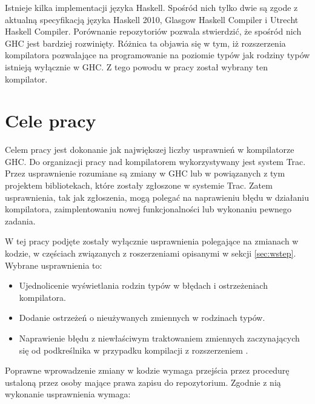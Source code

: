 Istnieje kilka implementacji języka Haskell. Spośród nich tylko dwie są zgode z aktualną specyfikacją języka Haskell 2010, Glasgow Haskell Compiler i Utrecht Haskell Compiler\cite{WikiImplementations}. Porównanie repozytoriów pozwala stwierdzić, że spośród nich GHC jest bardziej rozwinięty. Różnica ta objawia się w tym, iż rozszerzenia kompilatora pozwalające na programowanie na poziomie typów jak rodziny typów istnieją wyłącznie w GHC\cite{UHCUserGuide}. Z tego powodu w pracy został wybrany ten kompilator.


\section{Cele pracy}\label{sec:cele_pracy}

Celem pracy jest dokonanie jak największej liczby usprawnień w kompilatorze GHC. Do organizacji pracy nad kompilatorem wykorzystywany jest system Trac. Przez usprawnienie rozumiane są zmiany w GHC lub w powiązanych z tym projektem bibliotekach, które zostały zgłoszone w systemie Trac. Zatem usprawnienia, tak jak zgłoszenia, mogą polegać na naprawieniu błędu w działaniu kompilatora, zaimplentowaniu nowej funkcjonalności lub wykonaniu pewnego zadania.

W tej pracy podjęte zostały wyłącznie usprawnienia polegające na zmianach w kodzie, w częściach związanych z roszerzeniami opisanymi w sekcji \ref{sec:wstep}. Wybrane usprawnienia to:

\begin{itemize}
 \item Ujednolicenie wyświetlania rodzin typów w błędach i ostrzeżeniach kompilatora.
 \item Dodanie ostrzeżeń o nieużywanych zmiennych w rodzinach typów.
 \item Naprawienie błędu z niewłaściwym traktowaniem zmiennych zaczynających się od podkreślnika w przypadku kompilacji z rozszerzeniem . 
\end{itemize}

Poprawne wprowadzenie zmiany w kodzie wymaga przejścia przez procedurę ustaloną przez osoby mające prawa zapisu do repozytorium\cite{WikiFixingBugs}. Zgodnie z nią wykonanie usprawnienia wymaga:

